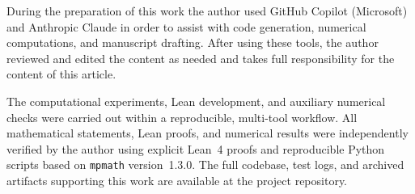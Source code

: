 \documentclass[11pt,a4paper]{article}
\theoremstyle{definition}
\begin{document}
During the preparation of this work the author used GitHub Copilot
(Microsoft) and Anthropic Claude in order to assist with code
generation, numerical computations, and manuscript drafting.  After
using these tools, the author reviewed and edited the content as
needed and takes full responsibility for the content of this
article.

The computational experiments, Lean development, and auxiliary
numerical checks were carried out within a reproducible, multi-tool
workflow.  All mathematical statements, Lean proofs, and numerical
results were independently verified by the author using explicit
Lean~4 proofs and reproducible Python scripts based on
\texttt{mpmath} version~1.3.0.  The full codebase, test logs, and
archived artifacts supporting this work are available at the project
repository.
\end{document}
